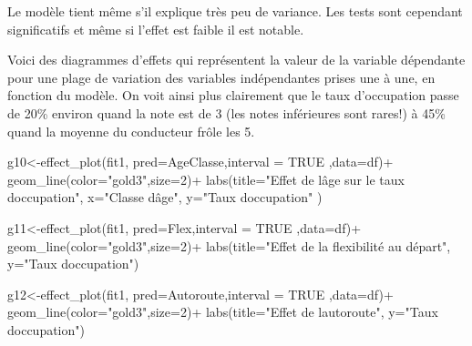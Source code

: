 \documentclass[
]{book}
\newenvironment{Shaded}{\begin{snugshade}}{\end{snugshade}}
\newcommand{\AttributeTok}[1]{\textcolor[rgb]{0.77,0.63,0.00}{#1}}
\newcommand{\ConstantTok}[1]{\textcolor[rgb]{0.00,0.00,0.00}{#1}}
\newcommand{\DecValTok}[1]{\textcolor[rgb]{0.00,0.00,0.81}{#1}}
\newcommand{\FunctionTok}[1]{\textcolor[rgb]{0.00,0.00,0.00}{#1}}
\newcommand{\NormalTok}[1]{#1}
\newcommand{\OtherTok}[1]{\textcolor[rgb]{0.56,0.35,0.01}{#1}}
\newcommand{\SpecialCharTok}[1]{\textcolor[rgb]{0.00,0.00,0.00}{#1}}
\newcommand{\StringTok}[1]{\textcolor[rgb]{0.31,0.60,0.02}{#1}}
\begin{document}
Le modèle tient même s'il explique très peu de variance. Les tests sont cependant significatifs et même si l'effet est faible il est notable.

Voici des diagrammes d'effets qui représentent la valeur de la variable dépendante pour une plage de variation des variables indépendantes prises une à une, en fonction du modèle. On voit ainsi plus clairement que le taux d'occupation passe de 20\% environ quand la note est de 3 (les notes inférieures sont rares!) à 45\% quand la moyenne du conducteur frôle les 5.

\begin{Shaded}
\begin{Highlighting}[]
\NormalTok{g10}\OtherTok{\textless{}{-}}\FunctionTok{effect\_plot}\NormalTok{(fit1, }\AttributeTok{pred=}\NormalTok{AgeClasse,}\AttributeTok{interval =} \ConstantTok{TRUE}\NormalTok{ ,}\AttributeTok{data=}\NormalTok{df)}\SpecialCharTok{+}
  \FunctionTok{geom\_line}\NormalTok{(}\AttributeTok{color=}\StringTok{"gold3"}\NormalTok{,}\AttributeTok{size=}\DecValTok{2}\NormalTok{)}\SpecialCharTok{+}
  \FunctionTok{labs}\NormalTok{(}\AttributeTok{title=}\StringTok{"Effet de l\textquotesingle{}âge sur le taux d\textquotesingle{}occupation"}\NormalTok{,}
       \AttributeTok{x=}\StringTok{"Classe d\textquotesingle{}âge"}\NormalTok{,}
       \AttributeTok{y=}\StringTok{"Taux d\textquotesingle{}occupation"}
\NormalTok{       )}

\NormalTok{g11}\OtherTok{\textless{}{-}}\FunctionTok{effect\_plot}\NormalTok{(fit1, }\AttributeTok{pred=}\NormalTok{Flex,}\AttributeTok{interval =} \ConstantTok{TRUE}\NormalTok{  ,}\AttributeTok{data=}\NormalTok{df)}\SpecialCharTok{+}
  \FunctionTok{geom\_line}\NormalTok{(}\AttributeTok{color=}\StringTok{"gold3"}\NormalTok{,}\AttributeTok{size=}\DecValTok{2}\NormalTok{)}\SpecialCharTok{+}
  \FunctionTok{labs}\NormalTok{(}\AttributeTok{title=}\StringTok{"Effet de la flexibilité au départ"}\NormalTok{,}
       \AttributeTok{y=}\StringTok{"Taux d\textquotesingle{}occupation"}\NormalTok{)}


\NormalTok{g12}\OtherTok{\textless{}{-}}\FunctionTok{effect\_plot}\NormalTok{(fit1, }\AttributeTok{pred=}\NormalTok{Autoroute,}\AttributeTok{interval =} \ConstantTok{TRUE}\NormalTok{  ,}\AttributeTok{data=}\NormalTok{df)}\SpecialCharTok{+}
  \FunctionTok{geom\_line}\NormalTok{(}\AttributeTok{color=}\StringTok{"gold3"}\NormalTok{,}\AttributeTok{size=}\DecValTok{2}\NormalTok{)}\SpecialCharTok{+}
  \FunctionTok{labs}\NormalTok{(}\AttributeTok{title=}\StringTok{"Effet de l\textquotesingle{}autoroute"}\NormalTok{,}
       \AttributeTok{y=}\StringTok{"Taux d\textquotesingle{}occupation"}\NormalTok{)}



\end{Highlighting}
\end{Shaded}
\end{document}
